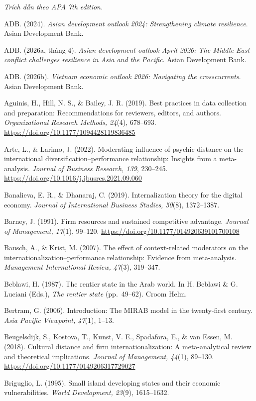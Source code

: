 \documentclass[
  a4paper,
  13pt]{extreport}
\begin{document}
\emph{Trích dẫn theo APA 7th edition.}

ADB. (2024). \emph{Asian development outlook 2024: Strengthening climate
resilience}. Asian Development Bank.

ADB. (2026a, tháng 4). \emph{Asian development outlook April 2026: The
Middle East conflict challenges resilience in Asia and the Pacific}.
Asian Development Bank.

ADB. (2026b). \emph{Vietnam economic outlook 2026: Navigating the
crosscurrents}. Asian Development Bank.

Aguinis, H., Hill, N. S., \& Bailey, J. R. (2019). Best practices in
data collection and preparation: Recommendations for reviewers, editors,
and authors. \emph{Organizational Research Methods, 24}(4), 678--693.
\url{https://doi.org/10.1177/1094428119836485}

Arte, L., \& Larimo, J. (2022). Moderating influence of psychic distance
on the international diversification--performance relationship: Insights
from a meta-analysis. \emph{Journal of Business Research, 139},
230--245. \url{https://doi.org/10.1016/j.jbusres.2021.09.060}

Banalieva, E. R., \& Dhanaraj, C. (2019). Internalization theory for the
digital economy. \emph{Journal of International Business Studies,
50}(8), 1372--1387.

Barney, J. (1991). Firm resources and sustained competitive advantage.
\emph{Journal of Management, 17}(1), 99--120.
\url{https://doi.org/10.1177/014920639101700108}

Bausch, A., \& Krist, M. (2007). The effect of context-related
moderators on the internationalization--performance relationship:
Evidence from meta-analysis. \emph{Management International Review,
47}(3), 319--347.

Beblawi, H. (1987). The rentier state in the Arab world. In H. Beblawi
\& G. Luciani (Eds.), \emph{The rentier state} (pp.~49--62). Croom Helm.

Bertram, G. (2006). Introduction: The MIRAB model in the twenty-first
century. \emph{Asia Pacific Viewpoint, 47}(1), 1--13.

Beugelsdijk, S., Kostova, T., Kunst, V. E., Spadafora, E., \& van Essen,
M. (2018). Cultural distance and firm internationalization: A
meta-analytical review and theoretical implications. \emph{Journal of
Management, 44}(1), 89--130.
\url{https://doi.org/10.1177/0149206317729027}

Briguglio, L. (1995). Small island developing states and their economic
vulnerabilities. \emph{World Development, 23}(9), 1615--1632.
\end{document}
